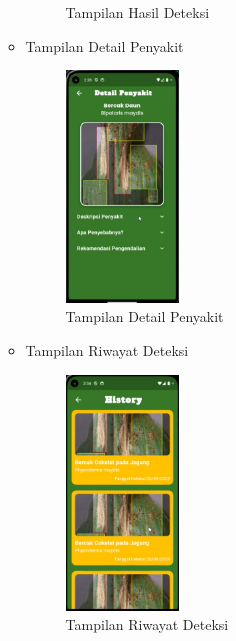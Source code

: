 \documentclass[journal,article,submit,pdftex,moreauthors]{Definitions/mdpi}
\begin{document}
\begin{itemize}
\begin{itemize}
\begin{figure}[H]
            \caption{\centering Tampilan Hasil Deteksi}
            \label{fig:activity-view-history}
        \end{figure}
        \item Tampilan Detail Penyakit
        \begin{figure}[H]
            \centering
            \includegraphics[width=0.3\textwidth]{Images/detail_disease_view.png}
            \caption{\centering Tampilan Detail Penyakit}
            \label{fig:activity-view-history}
        \end{figure}
        \item Tampilan Riwayat Deteksi
        \begin{figure}[H]
            \centering
            \includegraphics[width=0.3\textwidth]{Images/history_view.png}
            \caption{\centering Tampilan Riwayat Deteksi}
            \label{fig:activity-view-history}
        \end{figure}
    \end{itemize}


\end{itemize}
\end{document}
